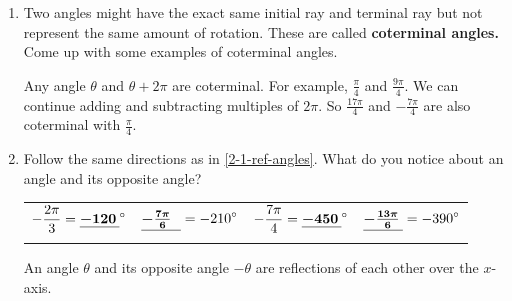\documentclass[main]{subfiles}
\begin{document}
\begin{enumerate}[resume]
\item
\begin{problem}
    Two angles might have the exact same initial ray and terminal ray but not represent the same amount of rotation. These are called \textbf{coterminal angles.} Come up with some examples of coterminal angles.
\end{problem}
\pspace{\vfill}

\begin{solution}
    Any angle $\theta$ and $\theta + 2\pi$ are coterminal. For example, $\frac{\pi}{4}$ and $\frac{9\pi}{4}$. We can continue adding and subtracting multiples of $2\pi$. So $\frac{17\pi}{4}$ and $-\frac{7\pi}{4}$ are also coterminal with $\frac{\pi}{4}$.
\end{solution}

\item   

Follow the same directions as in \ref{2-1-ref-angles}. What do you notice about an angle and its opposite angle?

  {
    \newcommand{\drawcircle}{
      \begin{tikzpicture}[scale=0.9]
        \begin{axis}[width=2in, height=2in, axis equal=true,
        xtick=\empty, ytick=\empty]
          \addplot+[domain=0:360] ({cos(x)}, {sin(x)});
        \end{axis}
      \end{tikzpicture}
    }

    \begin{tabular}{cccc}
      $\displaystyle -\frac{2\pi}{3} = \fitb{1cm}{-120}^\circ$ &
      $\fitb{1cm}{-\frac{7\pi}{6}} = \displaystyle -210^\circ$ & 
      $\displaystyle -\frac{7\pi}{4} = \fitb{1cm}{-450}^\circ$ &
      $\fitb{1cm}{-\frac{13\pi}{6}} = \displaystyle -390^\circ$ \\
      \probonly{\drawcircle}
      \solonly{
        \begin{tikzangle}[angle=-2*pi/3]
        \end{tikzangle}        
      }
      &
      \probonly{\drawcircle}
      \solonly{
        \begin{tikzangle}[angle=-7*pi/6]

        \end{tikzangle}
      } &
      \probonly{\drawcircle}
      \solonly{
        \begin{tikzangle}[angle=-7*pi/4]

        \end{tikzangle}        
      } &
      \probonly{\drawcircle}
      \solonly{
        \begin{tikzangle}[angle=-13*pi/6]

        \end{tikzangle}
      }
    \end{tabular}
  }

\begin{solution}
    An angle $\theta$ and its opposite angle $-\theta$ are reflections of each other over the $x$-axis.
\end{solution}
  
\end{enumerate}
\end{document}
